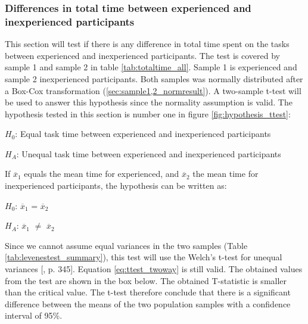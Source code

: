 \subsubsection[Sample 1, 2]{Differences in total time between experienced and inexperienced participants}\label{sec:t-test_result} 
This section will test if there is any difference in total time spent on the tasks between experienced and inexperienced participants. The test is covered by sample 1 and sample 2 in table \ref{tab:totaltime_all}. Sample 1 is experienced and sample 2 inexperienced participants. Both samples was normally distributed after a Box-Cox transformation (\ref{sec:sample1,2_normresult}). A two-sample t-test will be used to answer this hypothesis since the normality assumption is valid. The hypothesis tested in this section is number one in figure \ref{fig:hypothesis_ttest}: \\[0.3cm]

\centerline{$H_{0}$: Equal task time between experienced and inexperienced participants} 
\centerline{$H_{A}$: Unequal task time between experienced and inexperienced participants}
\vspace{0.3cm}

If $\overline{x}_1$ equals the mean time for experienced, and $\overline{x}_2$ the mean time for inexperienced participants, the hypothesis can be written as:\\[0.3cm]

\centerline{$H_{0}$: $\overline{x}_1$ = $\overline{x}_2$} 
\centerline{$H_{A}$: $\overline{x}_1$ $\neq$ $\overline{x}_2$}

\vspace{0.3cm}

Since we cannot assume equal variances in the two samples (Table \ref{tab:levenestest_summary}), this test will use the Welch's t-test for unequal variances [\citep{Walpole2012}, p. 345]. Equation \ref{eq:ttest_twoway} is still valid. The obtained values from the test are shown in the box below. The obtained T-statistic is smaller than the critical value. The t-test therefore conclude that there is a significant difference between the means of the two population samples with a confidence interval of 95\%.\\[0.2cm]

